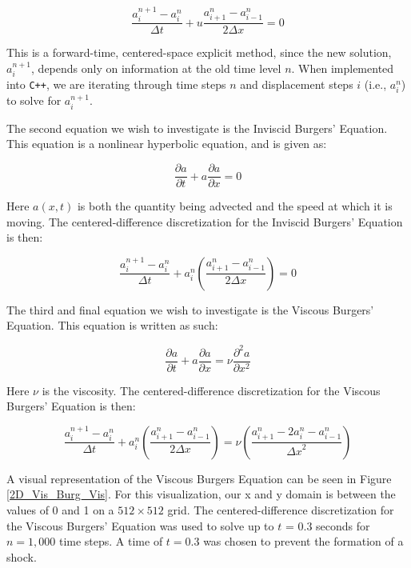 \documentclass{article}
\begin{document}
\begin{equation}
 \frac{a_i^{n+1} - a_i^n}{\Delta t} + u \frac{a_{i+1}^n - a_{i-1}^n}{2 \Delta x}  = 0
\end{equation}

This is a forward-time, centered-space explicit method, since the new solution, $a_i^{n+1}$, depends only on information at the old time level $n$. When implemented into \texttt{C++}, we are iterating through time steps $n$ and displacement steps $i$ (i.e., $a_i^n$) to solve for $a_i^{n+1}$.




The second equation we wish to investigate is the Inviscid Burgers’ Equation. This equation is a nonlinear hyperbolic equation, and is given as:

\begin{equation}
 \frac{\partial a}{\partial t} + a \frac{\partial a}{\partial x} = 0
\end{equation}

Here $a(x,t)$ is both the quantity being advected and the speed at which it is moving. The centered-difference discretization for the Inviscid Burgers' Equation is then:

\begin{equation}
 \frac{a_i^{n+1} - a_i^n}{\Delta t} +  a_i^n ( \frac{a_{i+1}^n - a_{i-1}^n}{2 \Delta x} ) = 0
\end{equation}

The third and final equation we wish to investigate is the Viscous Burgers' Equation. This equation is written as such:

\begin{equation}
 \frac{\partial a}{\partial t} + a \frac{\partial a}{\partial x} = \nu \frac{\partial ^2 a}{\partial x^2} 
\end{equation}

Here $\nu$ is the viscosity. The centered-difference discretization for the Viscous Burgers' Equation is then:

\begin{equation}
 \frac{a_i^{n+1} - a_i^n}{\Delta t} + a_i^n ( \frac{a_{i+1}^n - a_{i-1}^n}{2 \Delta x} ) = \nu (\frac{a_{i+1}^n - 2a_i^n - a_{i-1}^n}{{\Delta x}^2})
\end{equation}


 A visual representation of the Viscous Burgers Equation can be seen in Figure \ref{2D_Vis_Burg_Vis}. For this visualization, our x and y domain is between the values of 0 and 1 on a $512 \times 512$ grid. The centered-difference discretization for the Viscous Burgers' Equation was used to solve up to $t$ = 0.3 seconds for $n = 1,000$ time steps. A time of $t = 0.3$ was chosen to prevent the formation of a shock. 
\end{document}
